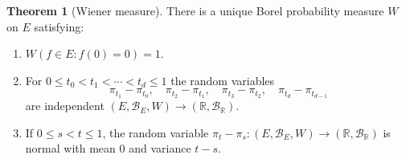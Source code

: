 \documentclass{article}
\theoremstyle{definition}
\newtheorem{theorem}{Theorem}
\theoremstyle{definition}
\begin{document}
\begin{theorem}[Wiener measure]
There is a unique  Borel probability measure $W$ on $E$ satisfying:
\begin{enumerate}
\item $W(f \in E: f(0)=0) = 1$.
\item For $0 \leq t_0 < t_1<\cdots<t_d \leq 1$ the random variables 
\[
\pi_{t_1}-\pi_{t_0}, \quad \pi_{t_2}-\pi_{t_1}, \quad \pi_{t_3}-\pi_{t_2},\quad
\pi_{t_d}-\pi_{t_{d-1}}
\]
are independent $(E,\mathscr{B}_E,W) \to (\mathbb{R},\mathscr{B}_{\mathbb{R}})$.
\item If $0 \leq s < t \leq 1$, the random variable $\pi_t-\pi_s:(E,\mathscr{B}_E,W) \to (\mathbb{R},\mathscr{B}_{\mathbb{R}})$ is normal with mean $0$ and variance $t-s$.
\end{enumerate} 
\end{theorem}
\end{document}
